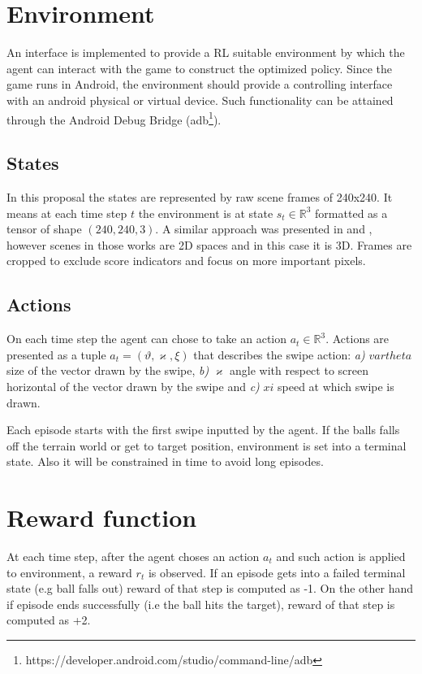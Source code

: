 \documentclass[peerreview,onecolumn]{IEEEtran}
\begin{document}
   \section{Environment}
   
	An interface is implemented to provide a RL suitable environment by which the agent can interact with the game to construct the optimized policy. Since the game runs in Android, the environment should provide a controlling interface with an android physical or virtual device. Such functionality can be attained through the Android Debug Bridge (adb\footnote{https://developer.android.com/studio/command-line/adb}). 
	
	\subsection{States}	
	
	In this proposal the states are represented by raw scene frames of 240x240. It means at each time step $t$ the environment is at state $s_t \in \mathbb{R}^3$ formatted as a tensor of shape $(240, 240, 3)$. A similar approach was presented in \cite{ddpg_2015} and \cite{replay_buffer_2015}, however scenes in those works are 2D spaces and in this case it is 3D. Frames are cropped to exclude score indicators and focus on more important pixels.
	
	\subsection{Actions}
	
	On each time step the agent can chose to take an action $a_t \in \mathbb{R}^3$. Actions are presented as a tuple $a_t=(\vartheta, \varkappa, \xi)$ that describes the swipe action: \textit{a)} $vartheta$ size of the vector drawn by the swipe, \textit{b)} $\varkappa$ angle with respect to screen horizontal of the vector drawn by the swipe and \textit{c)} $xi$ speed at which swipe is drawn.
	
	Each episode starts with the first swipe inputted by the agent. If the balls falls off the terrain world or get to target position, environment is set into a terminal state. Also it will be constrained in time to avoid long episodes. 
	
	\section{Reward function}
	
	At each time step, after the agent choses an action $a_t$ and such action is applied to environment, a reward $r_t$ is observed. If an episode gets into a failed terminal state (e.g ball falls out) reward of that step is computed as -1. On the other hand if episode ends successfully (i.e the ball hits the target), reward of that step is computed as +2.
	
\end{document}
